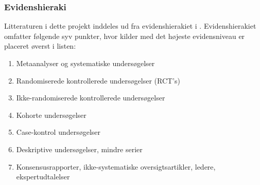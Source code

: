 \subsubsection{Evidenshieraki}
Litteraturen i dette projekt inddeles ud fra evidenshierakiet i . Evidenshierakiet omfatter følgende syv punkter, hvor kilder med det højeste evidensniveau er placeret øverst i listen:

\begin{enumerate}
\item Metaanalyser og systematiske undersøgelser 
\item Randomiserede kontrollerede undersøgelser (RCT’s)
\item Ikke-randomiserede kontrollerede undersøgelser
\item Kohorte undersøgelser
\item Case-kontrol undersøgelser
\item Deskriptive undersøgelser, mindre serier
\item Konsensusrapporter, ikke-systematiske oversigtsartikler, ledere, ekspertudtalelser
\end{enumerate}

